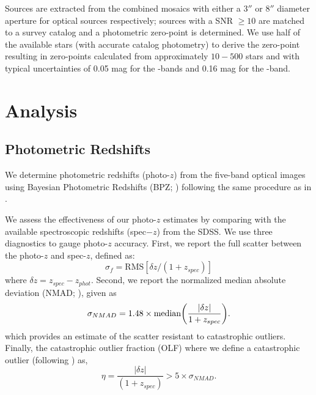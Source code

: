 \documentclass[apj, revtex4-1]{emulateapj}
\begin{document}
Sources are extracted from the combined mosaics with either a $3''$ or $8''$ diameter aperture for optical sources respectively; sources with a SNR $\ge10$ are matched to a survey catalog and a photometric zero-point is determined. We use half of the available stars (with accurate catalog photometry) to derive the zero-point resulting in zero-points calculated from approximately $10-500$ stars and with typical uncertainties of 0.05 mag for the \sdssg\sdssr\sdssi-bands and 0.16 mag for the \sdssz-band.

\section{Analysis}\label{sec:analysis}
\subsection{Photometric Redshifts}
We determine photometric redshifts (photo-$z$) from the five-band optical images using Bayesian Photometric Redshifts (BPZ; \citealt{Benitez2000, Coe2006}) following the same procedure as in \cite{Menanteau2009a}.

We assess the effectiveness of our photo-$z$ estimates by comparing with the available spectroscopic redshifts (spec$-z$) from the SDSS. We use three diagnostics to gauge photo-$z$ accuracy. First, we report the full scatter between the photo-$z$ and spec-$z$, defined as:
\begin{equation}
	\sigma_f = \mathrm{RMS}[\delta z/(1+z_{spec})]
\end{equation}
where $\delta z = z_{spec} - z_{phot}$. Second, we report the normalized median absolute deviation (NMAD; \citealt{Ilbert2009, Dahlen2013, Molino2017}), given as
\begin{equation}
	\sigma_{NMAD} = 1.48 \times \mathrm{median} \bigg{(} \frac{|\delta z|}{1+z_{spec}} \bigg{)}.
\end{equation}
which provides an estimate of the scatter resistant to catastrophic outliers. Finally, the catastrophic outlier fraction (OLF) where we define a catastrophic outlier (following \citealt{Molino2017}) as,
\begin{equation}
	\eta = \frac{|\delta z|}{(1+z_{spec})} > 5 \times \sigma_{NMAD}.
\end{equation}
\end{document}
